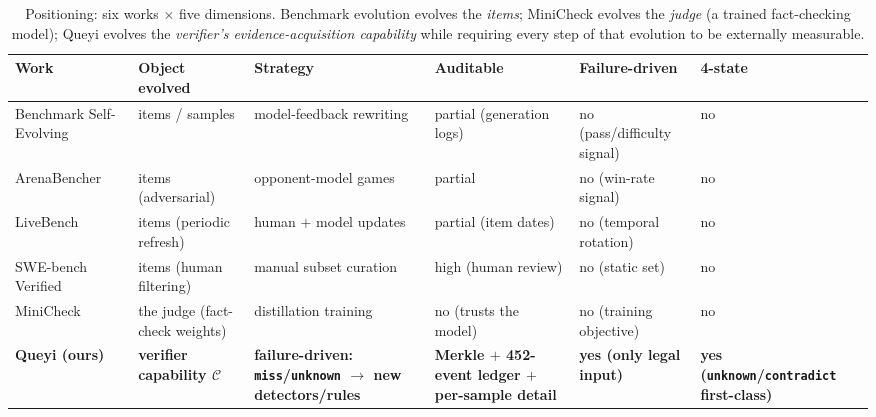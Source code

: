\documentclass{article}
\begin{document}
\begin{table}[t]
\caption{Positioning: six works $\times$ five dimensions. Benchmark evolution evolves the
\emph{items}; MiniCheck evolves the \emph{judge} (a trained fact-checking model); Queyi evolves
the \emph{verifier's evidence-acquisition capability} while requiring every step of that
evolution to be externally measurable.}
\label{tab:positioning}
\centering
\footnotesize
\begin{tabular}{@{}p{2.5cm}p{2.2cm}p{2.6cm}p{2.2cm}p{2.1cm}p{2.0cm}@{}}
\toprule
Work & Object evolved & Strategy & Auditable & Failure-driven & 4-state \\
\midrule
Benchmark Self-Evolving~\cite{wang2024benchmarkevolving} & items / samples & model-feedback rewriting & partial (generation logs) & no (pass/difficulty signal) & no \\
ArenaBencher~\cite{liu2025arenabencher} & items (adversarial) & opponent-model games & partial & no (win-rate signal) & no \\
LiveBench~\cite{white2024livebench} & items (periodic refresh) & human $+$ model updates & partial (item dates) & no (temporal rotation) & no \\
SWE-bench Verified~\cite{jimenez2024swebench,liang2025illusion} & items (human filtering) & manual subset curation & high (human review) & no (static set) & no \\
MiniCheck~\cite{tang2024minicheck} & the judge (fact-check weights) & distillation training & no (trusts the model) & no (training objective) & no \\
\textbf{Queyi (ours)} & \textbf{verifier capability $\mathcal{C}$} & \textbf{failure-driven: \texttt{miss}/\texttt{unknown} $\to$ new detectors/rules} & \textbf{Merkle $+$ 452-event ledger $+$ per-sample detail} & \textbf{yes (only legal input)} & \textbf{yes (\texttt{unknown}/\texttt{contradict} first-class)} \\
\bottomrule
\end{tabular}
\end{table}
\end{document}
